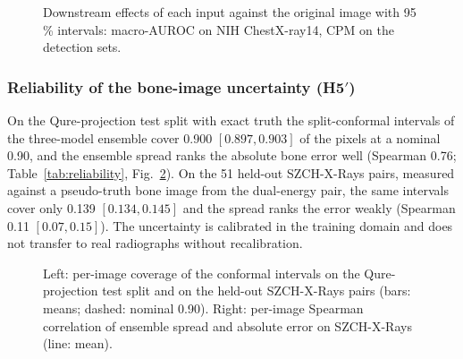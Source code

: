 \begin{table}[!t]
\centering
\caption{Downstream detection on Node21, TBX11K and VinBigData: CPM and mAP@50 (mean $\pm$ SD over three seeds), differences to the
original image and the difference in differences (DiD) of recall at two false positives per image (image bootstrap). both: the original,
soft-tissue and bone images as three channels.}
\label{tab:downstream_det}
\end{table}

\begin{figure}[!t]
\centering
{}
\caption{Downstream effects of each input against the original image with 95\,\% intervals: macro-AUROC on NIH ChestX-ray14, CPM on the
detection sets.}
\label{fig:downstream_forest}
\end{figure}

\subsubsection{Reliability of the bone-image uncertainty (H5$'$)}
On the Qure-projection test split with exact truth the split-conformal intervals of the three-model ensemble cover 0.900 $[0.897,0.903]$ of
the pixels at a nominal 0.90, and the ensemble spread ranks the absolute bone error well (Spearman 0.76; Table~\ref{tab:reliability},
Fig.~\ref{fig:reliability}). On the 51 held-out SZCH-X-Rays pairs, measured against a pseudo-truth bone image from the dual-energy pair,
the same intervals cover only 0.139 $[0.134,0.145]$ and the spread ranks the error weakly (Spearman 0.11 $[0.07,0.15]$). The uncertainty is
calibrated in the training domain and does not transfer to real radiographs without recalibration.

\begin{table}[!t]
\centering
\caption{Ensemble spread and split-conformal intervals ($K=3$, nominal coverage 0.90), with image-bootstrap intervals.}
\label{tab:reliability}
\end{table}

\begin{figure}[!t]
\centering
{}
\caption{Left: per-image coverage of the conformal intervals on the Qure-projection test split and on the held-out SZCH-X-Rays pairs (bars:
means; dashed: nominal 0.90). Right: per-image Spearman correlation of ensemble spread and absolute error on SZCH-X-Rays (line: mean).}
\label{fig:reliability}
\end{figure}

